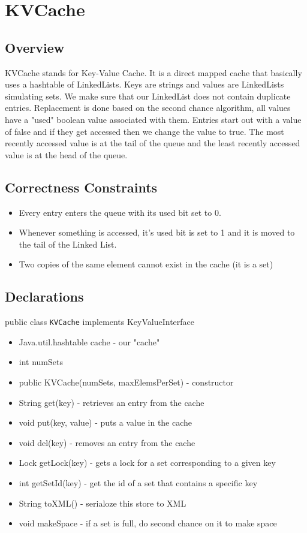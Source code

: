 \section{KVCache}

\subsection{Overview}
KVCache stands for Key-Value Cache. It is a direct mapped cache that basically uses 
a hashtable of LinkedLists. Keys are strings and values are LinkedLists simulating 
sets. We make sure that our LinkedList does not contain duplicate entries. Replacement 
is done based on the second chance algorithm, all values have a "used" boolean value associated 
with them. Entries start out with a value of false and if they get accessed then we change the 
value to true. The most recently accessed value is at the tail of the queue and the least 
recently accessed value is at the head of the queue.
\subsection{Correctness Constraints}
\begin{itemize}
\item Every entry enters the queue with its used bit set to 0.
\item Whenever something is accessed, it's used bit is set to 1 and it is moved to the tail of the Linked List.
\item Two copies of the same element cannot exist in the cache (it is a set)
\end{itemize}

\subsection{Declarations}
public class \texttt{KVCache} implements KeyValueInterface
\begin{itemize}
\item Java.util.hashtable cache - our "cache"
\item int numSets
\item public KVCache(numSets, maxElemsPerSet) - constructor
\item String get(key) - retrieves an entry from the cache
\item void put(key, value) - puts a value in the cache 
\item void del(key) - removes an entry from the cache
\item Lock getLock(key) - gets a lock for a set corresponding to a given key
\item int getSetId(key) - get the id of a set that contains a specific key
\item String toXML() - serialoze this store to XML
\item void makeSpace - if a set is full, do second chance on it to make space
\end{itemize}

